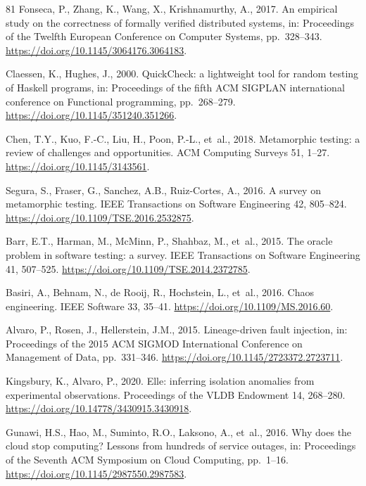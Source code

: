 \documentclass[final,5p,times,twocolumn,number]{elsarticle}
\begin{document}
\begin{thebibliography}{81}
Fonseca, P., Zhang, K., Wang, X., Krishnamurthy, A., 2017. An empirical study on the correctness of formally verified distributed systems, in: Proceedings of the Twelfth European Conference on Computer Systems, pp.~328--343. \url{https://doi.org/10.1145/3064176.3064183}.

Claessen, K., Hughes, J., 2000. QuickCheck: a lightweight tool for random testing of Haskell programs, in: Proceedings of the fifth ACM SIGPLAN international conference on Functional programming, pp.~268--279. \url{https://doi.org/10.1145/351240.351266}.

Chen, T.Y., Kuo, F.-C., Liu, H., Poon, P.-L., et~al., 2018. Metamorphic testing: a review of challenges and opportunities. ACM Computing Surveys 51, 1--27. \url{https://doi.org/10.1145/3143561}.

Segura, S., Fraser, G., Sanchez, A.B., Ruiz-Cortes, A., 2016. A survey on metamorphic testing. IEEE Transactions on Software Engineering 42, 805--824. \url{https://doi.org/10.1109/TSE.2016.2532875}.

Barr, E.T., Harman, M., McMinn, P., Shahbaz, M., et~al., 2015. The oracle problem in software testing: a survey. IEEE Transactions on Software Engineering 41, 507--525. \url{https://doi.org/10.1109/TSE.2014.2372785}.

Basiri, A., Behnam, N., de Rooij, R., Hochstein, L., et~al., 2016. Chaos engineering. IEEE Software 33, 35--41. \url{https://doi.org/10.1109/MS.2016.60}.

Alvaro, P., Rosen, J., Hellerstein, J.M., 2015. Lineage-driven fault injection, in: Proceedings of the 2015 ACM SIGMOD International Conference on Management of Data, pp.~331--346. \url{https://doi.org/10.1145/2723372.2723711}.

Kingsbury, K., Alvaro, P., 2020. Elle: inferring isolation anomalies from experimental observations. Proceedings of the VLDB Endowment 14, 268--280. \url{https://doi.org/10.14778/3430915.3430918}.

Gunawi, H.S., Hao, M., Suminto, R.O., Laksono, A., et~al., 2016. Why does the cloud stop computing? Lessons from hundreds of service outages, in: Proceedings of the Seventh ACM Symposium on Cloud Computing, pp.~1--16. \url{https://doi.org/10.1145/2987550.2987583}.


\end{thebibliography}
\end{document}
